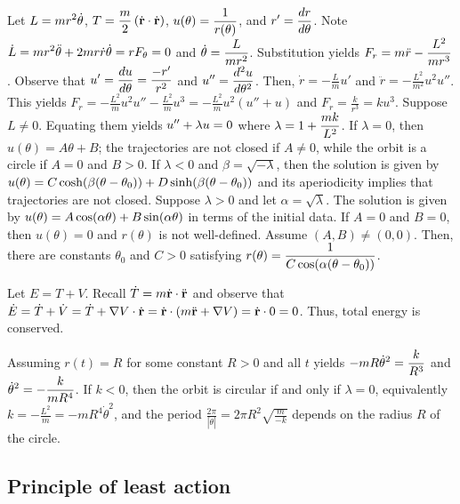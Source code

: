 \begin{answer}
	Let $\displaystyle L = mr^2 \dot{\theta}$, $\displaystyle T = \frac{m}{2}\left(\dot{\mathbf{r}} \cdot \dot{\mathbf{r}}\right)$, $\displaystyle u(\theta) = \frac{1}{r(\theta)}$, and $\displaystyle r' = \frac{dr}{d\theta}$.
	Note $\displaystyle \dot{L} = mr^2\ddot{\theta} + 2mr\dot{r} \dot{\theta} = r F_\theta = 0$ and $\displaystyle \dot{\theta} = \frac{L}{mr^2}$.
	Substitution yields $\displaystyle F_r = m \ddot{r} - \frac{L^2}{mr^3}$.
	Observe that $\displaystyle u' = \frac{du}{d\theta} = \frac{-r'}{r^2}$ and $\displaystyle u'' = \frac{d^2u}{d\theta^2}$.
	Then, $\dot{r} = -\frac{L}{m} u'$ and $\ddot{r} = - \frac{L^2}{m^2} u^2 u''$.
	This yields $F_r = - \frac{L^2}{m} u^2 u'' - \frac{L^2}{m} u^3 = -\frac{L^2}{m} u^2 \left(u'' + u\right)$ and $F_r = \frac{k}{r^3} = ku^3$.
	Suppose $L \neq 0$.
	Equating them yields $\displaystyle u'' + \lambda u = 0$ where $\displaystyle \lambda = 1 + \frac{mk}{L^2}$.
	If $\lambda = 0$, then $u(\theta) = A \theta + B$; the trajectories are not closed if $A \neq 0$, while the orbit is a circle if $A = 0$ and $B > 0$.
	If $\lambda < 0$ and $\beta = \sqrt{- \lambda}$, then the solution is given by $u(\theta) = C \cosh\!\left(\beta(\theta - \theta_0)\right) + D \sinh\!\left(\beta(\theta-\theta_0)\right)$ and its aperiodicity implies that trajectories are not closed.
	Suppose $\lambda > 0$ and let $\alpha = \sqrt{\lambda}$.
	The solution is given by $u(\theta) = A \cos\!\left(\alpha \theta\right) + B \sin\!\left(\alpha \theta\right)$ in terms of the initial data.
	If $A = 0$ and $B=0$, then $u(\theta) = 0$ and $r(\theta)$ is not well-defined.
	Assume $\left(A, B\right) \neq \left(0, 0\right)$.
	Then, there are constants $\theta_0$ and $C>0$ satisfying $\displaystyle r(\theta) = \frac{1}{C \cos\!\left(\alpha(\theta - \theta_0)\right)}$.

	Let $E = T + V$.
	Recall $\displaystyle \dot{T} = m \dot{\mathbf{r}} \cdot \ddot{\mathbf{r}}$ and observe that $\displaystyle \dot{E} = \dot{T} + \dot{V} = \dot{T} + \nabla V \cdot \dot{\mathbf{r}} = \dot{\mathbf{r}} \cdot \left(m\ddot{\mathbf{r}} + \nabla V\right) = \dot{\mathbf{r}} \cdot 0 = 0$.
	Thus, total energy is conserved.

	Assuming $r(t) = R$ for some constant $R > 0$ and all $t$ yields $\displaystyle -m R \dot{\theta}^2 = \frac{k}{R^3}$ and $\displaystyle \dot{\theta}^2 = - \frac{k}{mR^4}$.
	If $k < 0$, then the orbit is circular if and only if $\lambda = 0$, equivalently $k = -\frac{L^2}{m} = - m R^4 \dot{\theta}^2$, and the period $\frac{2 \pi}{\left|\dot{\theta}\right|} = 2 \pi R^2\sqrt{\frac{m}{-k}}$ depends on the radius $R$ of the circle.
\end{answer}

\subsection{Principle of least action}

